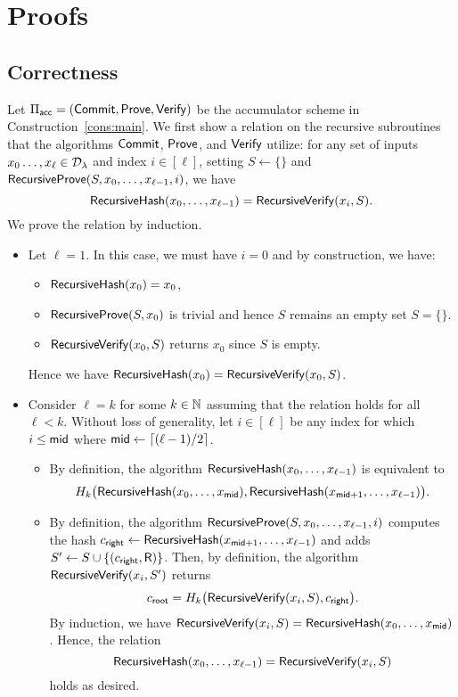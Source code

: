 \section{Proofs}

\subsection{Correctness}

Let $\Pi_{\mathsf{acc}} = (\mathsf{Commit}, \mathsf{Prove}, \mathsf{Verify})$ be the accumulator scheme in
Construction~\ref{cons:main}. 
We first show a relation on the recursive subroutines that the algorithms
$\mathsf{Commit}$, $\mathsf{Prove}$, and $\mathsf{Verify}$ utilize: for any set of inputs $x_0 \ldots,
x_\ell \in \mathcal{D}_\lambda$ and index $i \in [\ell]$, setting $S \gets \{ \}$ and
$\mathsf{RecursiveProve}(S, x_0, \ldots, x_{\ell-1}, i)$, we have
\[ \mathsf{RecursiveHash}(x_0, \ldots, x_{\ell-1}) = \mathsf{RecursiveVerify}(x_i, S) .\]
We prove the relation by induction.
\begin{itemize}
  \item Let $\ell = 1$. In this case, we must have $i=0$ and by construction, we
    have:
    \begin{itemize}
      \item $\mathsf{RecursiveHash}(x_0) = x_0$,
      \item $\mathsf{RecursiveProve}(S, x_0)$ is trivial and hence $S$ remains an empty
        set $S = \{ \}$.
      \item $\mathsf{RecursiveVerify}(x_0, S)$ returns $x_0$ since $S$ is empty.
    \end{itemize}
    Hence we have $\mathsf{RecursiveHash}(x_0) = \mathsf{RecursiveVerify}(x_0, S)$.
  \item Consider $\ell = k$ for some $k \in \mathbb{N}$ assuming that the relation holds
    for all $\ell < k$. Without loss of generality, let $i \in [\ell]$ be any
    index for which $i \le \mathsf{mid}$ where $\mathsf{mid} \gets \lceil (\ell - 1) / 2
    \rceil$. 
    \begin{itemize}
      \item By definition, the algorithm $\mathsf{RecursiveHash}(x_0, \ldots,
        x_{\ell-1})$ is equivalent to
        \[ H_k \big( \mathsf{RecursiveHash}(x_0, \ldots, \allowbreak x_{\mathsf{mid}}),
        \allowbreak \mathsf{RecursiveHash}(x_{\mathsf{mid}+1}, \ldots, x_{\ell-1}) \big) .\]
      \item By definition, the algorithm $\mathsf{RecursiveProve}(S, x_0, \ldots,
        x_{\ell-1}, i)$ computes the hash $c_{\mathsf{right}} \gets \mathsf{RecursiveHash}(x_{\mathsf{mid}
        + 1}, \ldots, x_{\ell-1})$ and adds $S' \gets S \cup \{ (c_{\mathsf{right}},
        \mathsf{R}) \}$. Then, by definition, the algorithm
        $\mathsf{RecursiveVerify}(x_i, S')$ returns
        \[ c_{\mathsf{root}} = H_k \big( \mathsf{RecursiveVerify}(x_i, S), c_{\mathsf{right}} \big) .\]
        By induction, we have $\mathsf{RecursiveVerify}(x_i, S) = \mathsf{RecursiveHash}(x_0,
        \ldots, x_{\mathsf{mid}})$. Hence, the relation
        \[ \mathsf{RecursiveHash}(x_0, \ldots, x_{\ell-1}) = \mathsf{RecursiveVerify}(x_i, S)
        \]
        holds as desired.
    \end{itemize}
\end{itemize}

